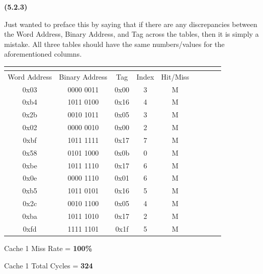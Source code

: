 \documentclass[11pt]{article}
\renewcommand\part[1]{\vspace{.10in}\textbf{(#1)}\par}
\begin{document}
	\part{5.2.3}
	Just wanted to preface this by saying that if there are any discrepancies between the Word Address, Binary Address, and Tag across the tables, then it is simply a mistake. All three tables should have the same numbers/values for the aforementioned columns.\par
		\begin{center}
		\begin{tabular}{|c|c|c|c|c|c|c|c|c|}
			\hline
			\multicolumn{5}{|c|}{\text{Cache 1}}\\
			\hline
			Word Address & Binary Address & Tag & Index & Hit/Miss\\
			\hline
			0x03 & 0000 0011 & 0x00 & 3 & M\\
			\hline
			0xb4 & 1011 0100 & 0x16 & 4 & M\\
			\hline
			0x2b & 0010 1011 & 0x05 & 3 & M\\
			\hline
			0x02 & 0000 0010 & 0x00 & 2 & M\\
			\hline
			0xbf & 1011 1111 & 0x17 & 7 & M\\
			\hline
			0x58 & 0101 1000 & 0x0b & 0 & M\\
			\hline
			0xbe & 1011 1110 & 0x17 & 6 & M\\
			\hline
			0x0e & 0000 1110 & 0x01 & 6 & M\\
			\hline
			0xb5 & 1011 0101 & 0x16 & 5 & M\\
			\hline
			0x2c & 0010 1100 & 0x05 & 4 & M\\
			\hline
			0xba & 1011 1010 & 0x17 & 2 & M\\
			\hline
			0xfd & 1111 1101 & 0x1f & 5 & M\\
			\hline
		\end{tabular}
		\end{center}\par
		Cache 1 Miss Rate = \textbf{100\%}\par
		Cache 1 Total Cycles  = \textbf{324}\par
\end{document}
